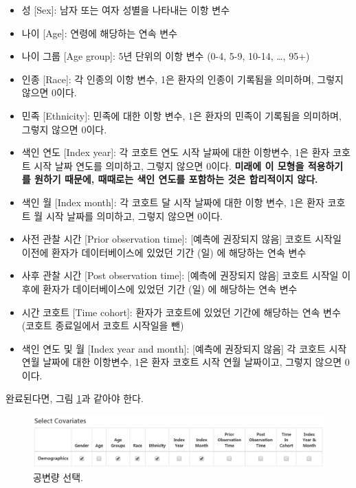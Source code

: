 \documentclass[11pt]{book}
\providecommand{\tightlist}{%
  \setlength{\itemsep}{0pt}\setlength{\parskip}{0pt}}
\theoremstyle{definition}
\theoremstyle{definition}
\theoremstyle{definition}
\theoremstyle{remark}
\begin{document}
\begin{itemize}
\tightlist
\item
  성 {[}Sex{]}: 남자 또는 여자 성별을 나타내는 이항 변수
\item
  나이 {[}Age{]}: 연령에 해당하는 연속 변수
\item
  나이 그룹 {[}Age group{]}: 5년 단위의 이항 변수 (0-4, 5-9, 10-14,
  \ldots{}, 95+)
\item
  인종 {[}Race{]}: 각 인종의 이항 변수, 1은 환자의 인종이 기록됨을
  의미하며, 그렇지 않으면 0이다.
\item
  민족 {[}Ethnicity{]}: 민족에 대한 이항 변수, 1은 환자의 민족이
  기록됨을 의미하며, 그렇지 않으면 0이다.
\item
  색인 연도 {[}Index year{]}: 각 코호트 연도 시작 날짜에 대한 이항변수,
  1은 환자 코호트 시작 날짜 연도를 의미하고, 그렇지 않으면 0이다.
  \textbf{미래에 이 모형을 적용하기를 원하기 때문에, 때때로는 색인
  연도를 포함하는 것은 합리적이지 않다.}
\item
  색인 월 {[}Index month{]}: 각 코호트 달 시작 날짜에 대한 이항 변수,
  1은 환자 코호트 월 시작 날짜를 의미하고, 그렇지 않으면 0이다.
\item
  사전 관찰 시간 {[}Prior observation time{]}: {[}예측에 권장되지
  않음{]} 코호트 시작일 이전에 환자가 데이터베이스에 있었던 기간 (일) 에
  해당하는 연속 변수
\item
  사후 관찰 시간 {[}Post observation time{]}: {[}예측에 권장되지 않음{]}
  코호트 시작일 이후에 환자가 데이터베이스에 있었던 기간 (일) 에
  해당하는 연속 변수
\item
  시간 코호트 {[}Time cohort{]}: 환자가 코호트에 있었던 기간에 해당하는
  연속 변수 (코호트 종료일에서 코호트 시작일을 뺀)
\item
  색인 연도 및 월 {[}Index year and month{]}: {[}예측에 권장되지 않음{]}
  각 코호트 시작 연월 날짜에 대한 이항변수, 1은 환자 코호트 시작 연월
  날짜이고, 그렇지 않으면 0이다.
\end{itemize}

완료된다면, 그림 \ref{fig:covariateSettings2}과 같아야 한다.

\begin{figure}

{\centering \includegraphics[width=1\linewidth]{images/PatientLevelPrediction/covariateSettings2} 

}

\caption{공변량 선택.}\label{fig:covariateSettings2}
\end{figure}
\end{document}
